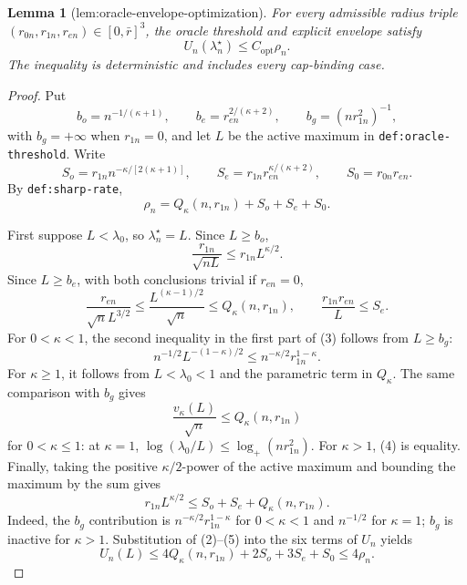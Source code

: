 \documentclass{article}
\newtheorem{lemma}{Lemma}
\begin{document}
\begin{lemma}[lem:oracle-envelope-optimization]\label{lem:oracle-envelope-optimization}
For every admissible radius triple \((r_{0n},r_{1n},r_{en})\in[0,\bar r]^3\), the oracle threshold and explicit envelope satisfy
\[
U_n(\lambda_n^\star)\leq C_{\mathrm{opt}}\rho_n.
\]
The inequality is deterministic and includes every cap-binding case.
\end{lemma}
\begin{proof}
Put
\[
b_o=n^{-1/(\kappa+1)},\qquad
b_e=r_{en}^{2/(\kappa+2)},\qquad
b_g=(nr_{1n}^2)^{-1},
\]
with \(b_g=+\infty\) when \(r_{1n}=0\), and let \(L\) be the active maximum in \texttt{def:oracle-threshold}.  Write
\[
S_o=r_{1n}n^{-\kappa/[2(\kappa+1)]},\qquad
S_e=r_{1n}r_{en}^{\kappa/(\kappa+2)},\qquad
S_0=r_{0n}r_{en}.
\]
By \texttt{def:sharp-rate},
\[
\rho_n=Q_\kappa(n,r_{1n})+S_o+S_e+S_0. \tag{1}
\]

First suppose \(L<\lambda_0\), so \(\lambda_n^\star=L\).  Since \(L\geq b_o\),
\[
\frac{r_{1n}}{\sqrt{nL}}\leq r_{1n}L^{\kappa/2}. \tag{2}
\]
Since \(L\geq b_e\), with both conclusions trivial if \(r_{en}=0\),
\[
\frac{r_{en}}{\sqrt nL^{3/2}}
\leq\frac{L^{(\kappa-1)/2}}{\sqrt n}
\leq Q_\kappa(n,r_{1n}),\qquad
\frac{r_{1n}r_{en}}L\leq S_e. \tag{3}
\]
For \(0<\kappa<1\), the second inequality in the first part of (3) follows from \(L\geq b_g\):
\[
n^{-1/2}L^{-(1-\kappa)/2}
\leq n^{-\kappa/2}r_{1n}^{1-\kappa}.
\]
For \(\kappa\geq1\), it follows from \(L<\lambda_0<1\) and the parametric term in \(Q_\kappa\).  The same comparison with \(b_g\) gives
\[
\frac{v_\kappa(L)}{\sqrt n}\leq Q_\kappa(n,r_{1n}) \tag{4}
\]
for \(0<\kappa\leq1\): at \(\kappa=1\),
\(\log(\lambda_0/L)\leq\log_+(nr_{1n}^2)\).  For \(\kappa>1\), (4) is equality.  Finally, taking the positive \(\kappa/2\)-power of the active maximum and bounding the maximum by the sum gives
\[
r_{1n}L^{\kappa/2}
\leq S_o+S_e+Q_\kappa(n,r_{1n}). \tag{5}
\]
Indeed, the \(b_g\) contribution is
\(n^{-\kappa/2}r_{1n}^{1-\kappa}\) for \(0<\kappa<1\) and \(n^{-1/2}\) for \(\kappa=1\); \(b_g\) is inactive for \(\kappa>1\).  Substitution of (2)--(5) into the six terms of \(U_n\) yields
\[
U_n(L)\leq4Q_\kappa(n,r_{1n})+2S_o+3S_e+S_0
\leq4\rho_n. \tag{6}
\]


\end{proof}
\end{document}
